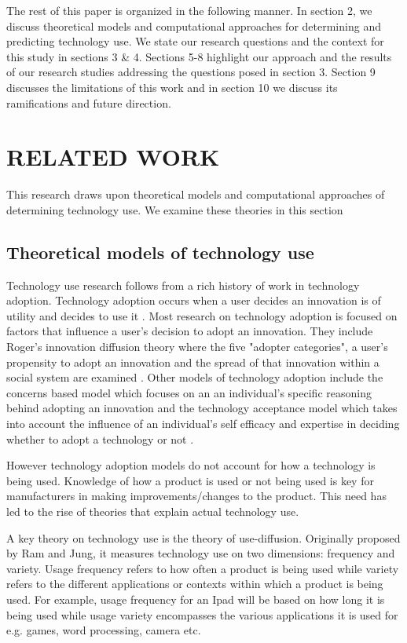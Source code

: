 \documentclass{acm_proc_article-sp}
\begin{document}
The rest of this paper is organized in the following manner. In section 2, we discuss theoretical models and computational approaches for determining and predicting technology use. We state our research questions and the context for this study in sections 3 \& 4. Sections 5-8 highlight our approach and the results of our research studies addressing the questions posed in section 3. Section 9 discusses the limitations of this work and in section 10 we discuss its ramifications and future direction.
 
\section{RELATED WORK} \label{section:relatedwork}
This research draws upon theoretical models and computational approaches of determining technology use. We examine these theories in this section
\subsection{Theoretical models of technology use}
Technology use research follows from a rich history of work in technology adoption. Technology adoption occurs when a user decides an innovation is of utility and decides to use it \cite{straub2009understanding}. Most research on technology adoption is focused on factors that influence a user's decision to adopt an innovation. They include Roger's innovation diffusion theory where the five "adopter categories", a user's propensity to adopt an innovation and the spread of that innovation within a social system are examined \cite{rogers2010diffusion}. Other models of technology adoption include the concerns based model which focuses on an an individual's specific reasoning behind adopting an innovation \cite{fuller1975concerns, hall1979concerns} and the technology acceptance model \cite{legris2003people} which takes into account the influence of an individual's self efficacy and expertise in deciding whether to adopt a technology or not \cite{legris2003people}.

However technology adoption models do not account for how a technology is being used. Knowledge of how a product is used or not being used is key for manufacturers in making improvements/changes to the product. This need has led to the rise of theories that explain actual technology use.

A key theory on technology use is the theory of use-diffusion. Originally proposed by Ram and Jung\cite{ram1990conceptualization}, it measures technology use on two dimensions: frequency and variety. Usage frequency refers to how often a product is being used while variety refers to the different applications or contexts within which a product is being used. For example, usage frequency for an Ipad will be based on how long it is being used while usage variety encompasses the various applications it is used for e.g. games, word processing, camera etc.
\end{document}
